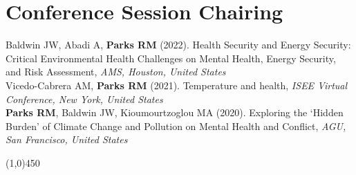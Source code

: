 \section*{Conference Session Chairing}

\noindent Baldwin JW,  Abadi A, \textbf{Parks RM} (2022). Health Security and Energy Security: Critical Environmental Health Challenges on Mental Health, Energy Security, and Risk Assessment, \textit{AMS, Houston, United States}\\

\noindent Vicedo-Cabrera AM, \textbf{Parks RM} (2021). Temperature and health, \textit{ISEE Virtual Conference, New York, United States}\\

\noindent \textbf{Parks RM}, Baldwin JW,  Kioumourtzoglou MA (2020). Exploring the ‘Hidden Burden’ of Climate Change and Pollution on Mental Health and Conflict, \textit{AGU, San Francisco, United States}

\begin{center} \line(1,0){450} \end{center}